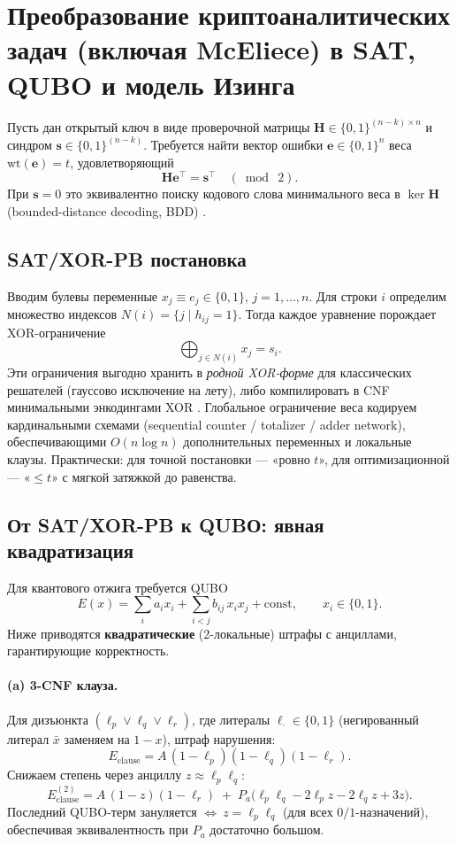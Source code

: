 
\section{Преобразование криптоаналитических задач (включая McEliece) в SAT, QUBO и модель Изинга}
Пусть дан открытый ключ в виде проверочной матрицы $\mathbf{H}\in\{0,1\}^{(n-k)\times n}$ и синдром $\mathbf{s}\in\{0,1\}^{(n-k)}$. Требуется найти вектор ошибки $\mathbf{e}\in\{0,1\}^n$ веса $\mathrm{wt}(\mathbf{e})=t$, удовлетворяющий
\[
\mathbf{H}\mathbf{e}^{\top}=\mathbf{s}^{\top}\quad(\bmod\ 2).
\]
При $\mathbf{s}=0$ это эквивалентно поиску кодового слова минимального веса в $\ker \mathbf{H}$ (bounded-distance decoding, BDD) \cite{ClassicMcEliece2020}.

\subsection{SAT/XOR-PB постановка}
Вводим булевы переменные $x_j\equiv e_j\in\{0,1\}$, $j=1,\dots,n$. Для строки $i$ определим множество индексов $N(i)=\{j\mid h_{ij}=1\}$. Тогда каждое уравнение порождает XOR-ограничение
\[
\bigoplus_{j\in N(i)} x_j = s_i .
\]
Эти ограничения выгодно хранить в \emph{родной XOR-форме} для классических решателей (гауссово исключение на лету), либо компилировать в CNF минимальными энкодингами XOR \cite{Zhang2000,Lafitte2014,Im2025}. Глобальное ограничение веса кодируем кардинальными схемами (sequential counter / totalizer / adder network), обеспечивающими $O(n\log n)$ дополнительных переменных и локальные клаузы. Практически: для точной постановки — «ровно $t$», для оптимизационной — «$\le t$» с мягкой затяжкой до равенства.

\subsection{От SAT/XOR-PB к QUBО: явная квадратизация}
Для квантового отжига требуется QUBO
\[
E(x)=\sum_i a_i x_i + \sum_{i<j} b_{ij}\,x_i x_j + \mathrm{const},\qquad x_i\in\{0,1\}.
\]
Ниже приводятся \textbf{квадратические} (2-локальные) штрафы с анциллами, гарантирующие корректность.

\paragraph{(a) 3-CNF клауза.}
Для дизъюнкта $(\ell_p\vee \ell_q\vee \ell_r)$, где литералы $\ell_\cdot\in\{0,1\}$ (негированный литерал $\bar x$ заменяем на $1-x$), штраф нарушения:
\[
E_{\mathrm{clause}}=A\,(1-\ell_p)(1-\ell_q)(1-\ell_r).
\]
Снижаем степень через анциллу $z\approx \ell_p\ell_q$:
\[
E_{\mathrm{clause}}^{(2)}=A\,(1-z)(1-\ell_r)\;+\;P_a\big(\ell_p\ell_q -2\ell_p z -2\ell_q z + 3 z\big).
\]
Последний QUBO-терм зануляется $\Leftrightarrow\ z=\ell_p\ell_q$ (для всех $0/1$-назначений), обеспечивая эквивалентность при $P_a$ достаточно большом.

